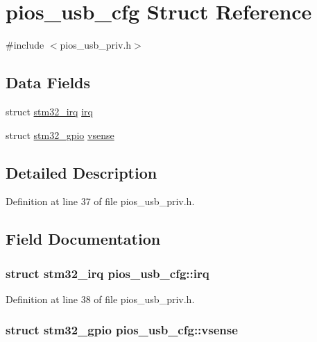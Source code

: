 \hypertarget{structpios__usb__cfg}{\section{pios\-\_\-usb\-\_\-cfg \-Struct \-Reference}
\label{structpios__usb__cfg}
}


{\ttfamily \#include $<$pios\-\_\-usb\-\_\-priv.\-h$>$}

\subsection*{\-Data \-Fields}
\begin{DoxyCompactItemize}
\item 
struct \hyperlink{structstm32__irq}{stm32\-\_\-irq} \hyperlink{structpios__usb__cfg_acf35c94952c92310b680586289e5b5b0}{irq}
\item 
struct \hyperlink{structstm32__gpio}{stm32\-\_\-gpio} \hyperlink{structpios__usb__cfg_a5a77bb8822ce4859959d3692f3ca165a}{vsense}
\end{DoxyCompactItemize}


\subsection{\-Detailed \-Description}


\-Definition at line 37 of file pios\-\_\-usb\-\_\-priv.\-h.



\subsection{\-Field \-Documentation}
\hypertarget{structpios__usb__cfg_acf35c94952c92310b680586289e5b5b0}{
\subsubsection[{irq}]{\setlength{\rightskip}{0pt plus 5cm}struct {\bf stm32\-\_\-irq} {\bf pios\-\_\-usb\-\_\-cfg\-::irq}}}\label{structpios__usb__cfg_acf35c94952c92310b680586289e5b5b0}


\-Definition at line 38 of file pios\-\_\-usb\-\_\-priv.\-h.

\hypertarget{structpios__usb__cfg_a5a77bb8822ce4859959d3692f3ca165a}{
\subsubsection[{vsense}]{\setlength{\rightskip}{0pt plus 5cm}struct {\bf stm32\-\_\-gpio} {\bf pios\-\_\-usb\-\_\-cfg\-::vsense}}}\label{structpios__usb__cfg_a5a77bb8822ce4859959d3692f3ca165a}


